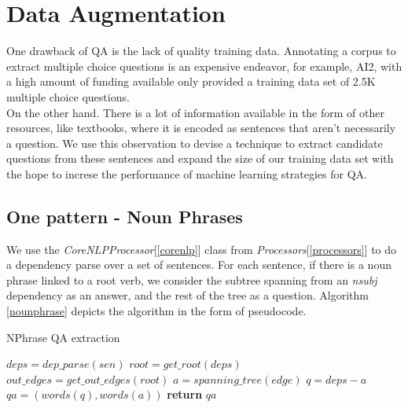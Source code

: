 \section{Data Augmentation}

One drawback of QA is the lack of quality training data. Annotating a corpus to extract multiple choice questions is an expensive endeavor, for example, AI2, with a high amount of funding available only provided a training data set of 2.5K multiple choice questions.\\
On the other hand. There is a lot of information available in the form of other resources, like textbooks, where it is encoded as sentences that aren't necessarily a question. We use this observation to devise a technique to extract candidate questions from these sentences and expand the size of our training data set with the hope to increse the performance of machine learning strategies for QA.\\

\subsection{One pattern - Noun Phrases}

We use the \emph{CoreNLPProcessor}[\ref{corenlp}] class from \emph{Processors}[\ref{processors}] to do a dependency parse over a set of sentences. For each sentence, if there is a noun phrase linked to a root verb, we consider the subtree spanning from an \emph{nsubj} dependency as an answer, and the rest of the tree as a question. Algorithm \ref{nounphrase} depicts the algorithm in the form of pseudocode.\\

\begin{algorithm}
\caption{NPhrase QA extraction}\label{nounphrase}
\begin{algorithmic}[1]
   \State $deps = dep\_parse(sen)$
   \State $root = get\_root(deps)$
   \State $out\_edges = get\_out\_edges(root)$
		\State $a = spanning\_tree(edge)$
		\State $q = deps - a$
		\State $qa = (words(q), words(a))$
		\State \textbf{return} $qa$
	\EndIf
   \EndFor
   \EndProcedure
\end{algorithmic}
\end{algorithm}
   
